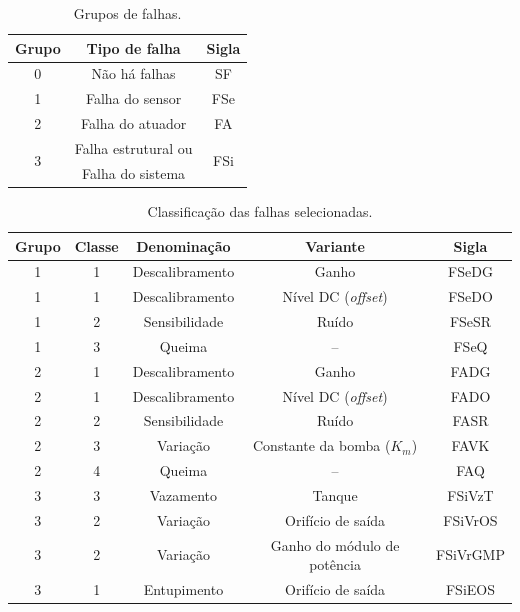 \begin{table}[!htb]
\centering
\caption{Grupos de falhas.}
\label{tab:grupos_falhas}
\vspace{0.25cm}
\begin{tabular}{|c|c|c|}
\hline
{\bf Grupo} & {\bf Tipo de falha} & {\bf Sigla}\\
\hline
\hline
0 & Não há falhas & SF\\
\hline
1 & Falha do sensor & FSe\\
\hline
2 & Falha do atuador & FA\\
\hline
\multirow{2}{*}{3} & 
Falha estrutural ou & 
\multirow{2}{*}{FSi}\\
&
Falha do sistema & 
\\
\hline
\end{tabular}
\end{table}

\begin{table}[!htb]
\centering
\caption{Classificação das falhas selecionadas.}
\label{tab:classificacao_falhas}
\vspace{0.25cm}
\begin{tabular}{|c|c|c|c|c|}
\hline
{\bf Grupo} & {\bf Classe} & {\bf Denominação} & {\bf Variante} & {\bf Sigla}\\
\hline
\hline
1 & 1 & Descalibramento & Ganho & FSeDG\\
\hline
1 & 1 & Descalibramento & Nível DC ({\it offset}) & FSeDO\\
\hline
1 & 2 & Sensibilidade & Ruído & FSeSR\\
\hline
1 & 3 & Queima & -- & FSeQ\\
\hline
\hline
2 & 1 & Descalibramento & Ganho & FADG\\
\hline
2 & 1 & Descalibramento & Nível DC ({\it offset}) & FADO\\
\hline
2 & 2 & Sensibilidade & Ruído & FASR\\
\hline
2 & 3 & Variação & Constante da bomba ($K_m$) & FAVK\\
\hline
2 & 4 & Queima & -- & FAQ\\
\hline
\hline
3 & 3 & Vazamento & Tanque & FSiVzT\\
\hline
3 & 2 & Variação & Orifício de saída & FSiVrOS\\
\hline
3 & 2 & Variação & Ganho do módulo de potência & FSiVrGMP\\
\hline
3 & 1 & Entupimento & Orifício de saída & FSiEOS\\
\hline
\end{tabular}
\end{table}


